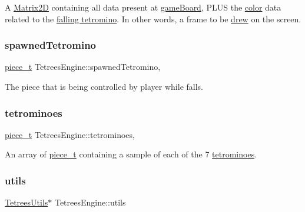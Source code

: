 A \hyperlink{classMatrix2D}{Matrix2D} containing all data present at \hyperlink{classTetreesEngine_a37d082a7816d6731b2703dd6d1a1cb97}{game\+Board}, P\+L\+US the \hyperlink{TetreesDefs_8hpp_a8ba5fbce2446135735693ab60c896bbd}{color} data related to the \hyperlink{classTetreesEngine_a26435ee2f02d9ba70d9e359745114f6e}{falling tetromino}. In other words, a frame to be \hyperlink{classTetreesUI_a357ae7240cc5f35b5d61244e7a6bcfe3}{drew} on the screen. \mbox{\label{classTetreesEngine_a26435ee2f02d9ba70d9e359745114f6e}} 
\subsubsection{\texorpdfstring{spawned\+Tetromino}{spawnedTetromino}}
{\footnotesize\ttfamily \hyperlink{structpiece__t}{piece\+\_\+t} Tetrees\+Engine\+::spawned\+Tetromino\hspace{0.3cm}{\ttfamily [static]}, {\ttfamily [private]}}

The piece that is being controlled by player while falls. \mbox{\label{classTetreesEngine_a07ae13fb62e86b45c834947243a913df}} 
\subsubsection{\texorpdfstring{tetrominoes}{tetrominoes}}
{\footnotesize\ttfamily \hyperlink{structpiece__t}{piece\+\_\+t} Tetrees\+Engine\+::tetrominoes\hspace{0.3cm}{\ttfamily [static]}, {\ttfamily [private]}}

An array of \hyperlink{structpiece__t}{piece\+\_\+t} containing a sample of each of the 7 \hyperlink{TetreesDefs_8hpp_adf4f8e2cbbd7d8894fe3beda39db1b8f}{tetrominoes}. \mbox{\label{classTetreesEngine_ac4d6256982306ab8a02e18793cb803c0}} 
\subsubsection{\texorpdfstring{utils}{utils}}
{\footnotesize\ttfamily \hyperlink{classTetreesUtils}{Tetrees\+Utils}$\ast$ Tetrees\+Engine\+::utils\hspace{0.3cm}{\ttfamily [private]}}

